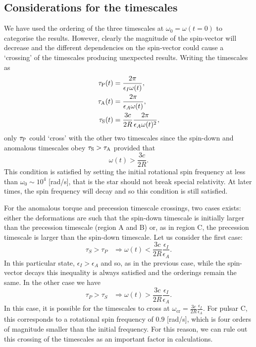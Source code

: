 \documentclass[../full_thesis/full_thesis.tex]{subfiles}
\begin{document}
\begin{subappendices}
\section{Considerations for the timescales}\label{sec: timescales}
We have used the ordering of the three timescales at $\omega_{0}=\omega(t=0)$
to categorise the results. However, clearly the magnitude of the spin-vector
will decrease and the different dependencies on the spin-vector could cause a
`crossing' of the timescales producing unexpected results. Writing the
timescales as
\begin{align}
\tau_{\mathrm{P}}(t)&=\frac{2\pi}{\epsilon_{I}\omega(t)}, \\
\tau_{\mathrm{A}}(t)&=\frac{2\pi}{\epsilon_{A}\omega(t)}, \\
\tau_{\mathrm{S}}(t)&=\frac{3c}{2R}\frac{2\pi}{\epsilon_{A}\omega(t)^{2}},
\end{align}
only $\tau_{\mathrm{P}}$ could `cross' with the other two timescales since the spin-down
and anomalous timescales obey $\tau_{\mathrm{S}}>\tau_{\mathrm{A}}$ provided that
\begin{equation}
\omega(t)>\frac{3c}{2R}.
\end{equation}
This condition is satisfied by setting the initial rotational spin frequency at
less than $\omega_{0} \sim 10^{4}$ [rad/s], that is the star should not break
special relativity. At later times, the spin frequency will decay and so this
condition is still satisfied.

For the anomalous torque and precession timescale crossings, two cases exists:
either the deformations are such that the spin-down timescale is initially larger than
the precession timescale (region A and B) or, as in region C, the precession
timescale is larger than the spin-down timescale. Let us consider the first case:
\begin{equation}
\tau_{S}>\tau_{P} \;\;\;
\Rightarrow \omega(t)<\frac{3c}{2R}\frac{\epsilon_{I}}{\epsilon_{A}}.
\end{equation}
In this particular state, $\epsilon_{I}>\epsilon_{A}$ and so, as in the previous
case, while the spin-vector decays this inequality is always satisfied and the
orderings remain the same. In the other case we have
\begin{equation}
\tau_{P}>\tau_{S} \;\;\;
\Rightarrow \omega(t)>\frac{3c}{2R}\frac{\epsilon_{I}}{\epsilon_{A}}.
\end{equation}
In this case, it is possible for the timescales to cross at
$\omega_{\textrm{cr}}=\frac{3c}{2R}\frac{\epsilon_{I}}{\epsilon_{A}}$. For pulsar C, this
corresponds to a rotational spin frequency of $0.9$ [rad/s], which is four
orders of magnitude smaller than the initial frequency. For this reason, we can
rule out this crossing of the timescales as an important factor in
calculations.


\end{subappendices}

\biblio
\end{document}
